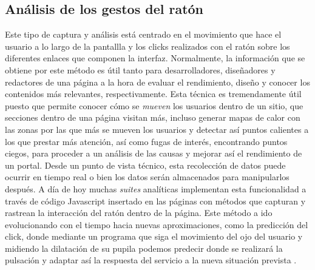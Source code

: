 \documentclass[12pt,a4paper,oneside]{book} %
\begin{document}
\subsection{Análisis de los gestos del ratón}
Este tipo de captura y análisis está centrado en el movimiento que hace el usuario a lo largo de la pantallla y los clicks realizados con el ratón sobre los diferentes enlaces que componen la interfaz. 
\newline \newline
Normalmente, la información que se obtiene por este método es útil tanto para desarrolladores, diseñadores y redactores de una página a la hora de evaluar el rendimiento, diseño y conocer los contenidos más relevantes, respectivamente. Esta técnica es tremendamente útil puesto que permite conocer cómo se \textit{mueven} los usuarios dentro de un sitio, que secciones dentro de una página visitan más, incluso generar mapas de calor con las zonas por las que más se mueven los usuarios y detectar así puntos calientes a los que prestar más atención, así como fugas de interés, encontrando puntos ciegos, para proceder a un análisis de las causas y mejorar así el rendimiento de un portal. 
\newline \newline
Desde un punto de vista técnico, esta recolección de datos puede ocurrir en tiempo real o bien los datos serán almacenados para manipularlos después. A día de hoy muchas \textit{suites} analíticas implementan esta funcionalidad a través de código Javascript insertado en las páginas con métodos que capturan y rastrean la interacción del ratón dentro de la página. 
\newline \newline
Este método a ido evolucionando con el tiempo hacia nuevas aproximaciones, como la predicción del click, donde mediante un programa que siga el movimiento del ojo del usuario y midiendo la dilatación de su pupila podemos predecir donde se realizará la pulsación y adaptar así la respuesta del servicio a la nueva situación prevista \cite{guachos}. 
\end{document}
